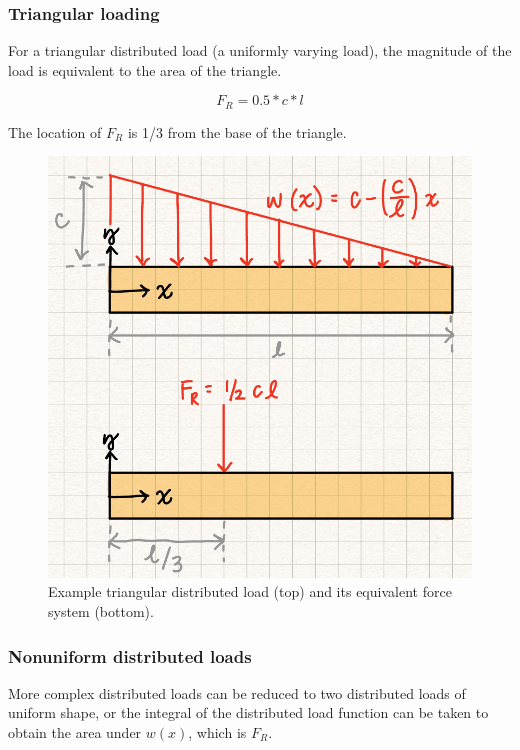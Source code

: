 \subsubsection{Triangular loading}

For a triangular distributed load (a uniformly varying load), the magnitude of the load is equivalent to the area of the triangle. 

\[F_R = 0.5*c*l\]

The location of $F_R$ is 1/3 from the base of the triangle. 


\begin{figure}[!h]
\centering
\includegraphics[angle=0, width=5 in]{ForceSystemsFigures/TriangleLoad.PNG}
\vspace{-2mm}
\caption{\small Example triangular distributed load (top) and its equivalent force system (bottom).}
\vspace{-3mm}
\label{Fig:TriLoad}
\end{figure}


\subsubsection{Nonuniform distributed loads}

More complex distributed loads can be reduced to two distributed loads of uniform shape, or the integral of the distributed load function can be taken to obtain the area under $w(x)$, which is $F_R$. 

